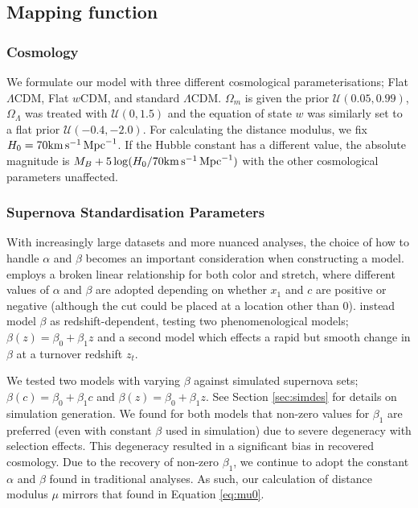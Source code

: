 \documentclass[a4paper,fleqn,usenatbib]{mnras}
\newcommand{\kmsmpc}{{\rm km}\,{\rm s}^{-1}\,{\rm Mpc}^{-1}}
\newcommand{\rubin}{\citetalias{Rubin2015}}
\begin{document}
\subsection{Mapping function}

\subsubsection{Cosmology}

We formulate our model with three different cosmological parameterisations; Flat $\Lambda$CDM, Flat $w$CDM, and standard $\Lambda$CDM. $\Omega_m$ is given the prior $\mathcal{U}(0.05, 0.99)$, $\Omega_\Lambda$ was treated with $\mathcal{U}(0, 1.5)$ and the equation of state $w$ was similarly set to a flat prior $\mathcal{U}(-0.4, -2.0)$. For calculating the distance modulus, we fix $H_0 = 70 \kmsmpc $. If the Hubble constant has a different value, the absolute magnitude is $M_B + 5\log(H_0/70 \kmsmpc )$ with the other cosmological parameters unaffected.

\subsubsection{Supernova Standardisation Parameters}

With increasingly large datasets and more nuanced analyses, the choice of how to handle $\alpha$ and $\beta$ becomes an important consideration when constructing a model. {\rubin} employs a broken linear relationship for both color and stretch, where different values of $\alpha$ and $\beta$ are adopted depending on whether $x_1$ and $c$ are positive or negative (although the cut could be placed at a location other than 0). \citet{Shariff2016} instead model $\beta$ as redshift-dependent, testing two phenomenological models; $\beta(z) = \beta_0 + \beta_1 z$ and a second model which effects a rapid but smooth change in $\beta$ at a turnover redshift $z_t$.

We tested two models with varying $\beta$ against simulated supernova sets; $\beta(c) = \beta_0 + \beta_1 c$ and $\beta(z) = \beta_0 + \beta_1 z$. See Section \ref{sec:simdes} for details on simulation generation. We found for both models that non-zero values for $\beta_1$ are preferred (even with constant $\beta$ used in simulation) due to severe degeneracy with selection effects. This degeneracy resulted in a significant bias in recovered cosmology. Due to the recovery of non-zero $\beta_1$, we continue to adopt the constant $\alpha$ and $\beta$ found in traditional analyses. As such, our calculation of distance modulus $\mu$ mirrors that found in Equation \eqref{eq:mu0}.
\end{document}
